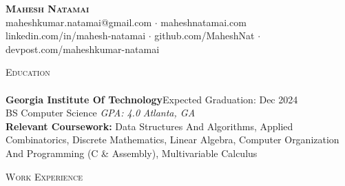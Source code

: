 \documentclass[a4paper]{article}
\newcommand{\lineunder} {
    \vspace*{-8pt} \\
    \hspace*{-18pt} \hrulefill \\
}
\newcommand{\header} [1] {
    {\hspace*{-18pt}\vspace*{6pt} \textsc{#1}}
    \vspace*{-6pt} \lineunder
}
\begin{document}
\vspace*{-40pt}

    

\vspace*{-10pt}
\begin{center}
	\textbf{\Huge \scshape {Mahesh Natamai}} \\
	maheshkumar.natamai@gmail.com $\cdot$ maheshnatamai.com \\ linkedin.com/in/mahesh-natamai $\cdot$ github.com/MaheshNat $\cdot$ devpost.com/maheshkumar-natamai\\
\end{center}

\header{Education}
\textbf{Georgia Institute Of Technology}\hfill  Expected Graduation: Dec 2024\\
BS Computer Science \textit{GPA: 4.0} \hfill \textit{Atlanta, GA} \\ 
\vspace{1mm} 
\textbf{Relevant Coursework:}
 Data Structures And Algorithms, Applied Combinatorics, Discrete Mathematics, Linear Algebra, Computer Organization And Programming (C \& Assembly), Multivariable Calculus\\
\vspace{1mm} 

\header{Work Experience}
\vspace{1mm}
\end{document}
